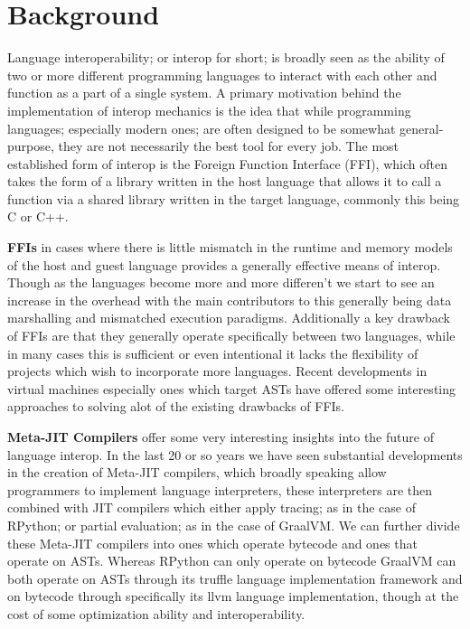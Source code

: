 \section{Background}\label{s:background}



Language interoperability; or interop for short; is broadly seen as the ability of two or more different programming languages to interact with each other and function as a part of a single system. A primary motivation behind the implementation of interop mechanics is the idea that while programming languages; especially modern ones; are often designed to be somewhat general-purpose, they are not necessarily the best tool for every job. The most established form of interop is the Foreign Function Interface (FFI), which often takes the form of a library written in the host language that allows it to call a function via a shared library written in the target language, commonly this being C or C++. 
\smallskip

\noindent \textbf{FFIs} in cases where there is little mismatch in the runtime and memory models of the host and guest language provides a generally effective means of interop. Though as the languages become more and more differen't we start to see an increase in the overhead with the main contributors to this generally being data marshalling and mismatched execution paradigms. Additionally a key drawback of FFIs are that they generally operate specifically between two languages, while in many cases this is sufficient or even intentional it lacks the flexibility of projects which wish to incorporate more languages. Recent developments in virtual machines especially ones which target ASTs have offered some interesting approaches to solving alot of the existing drawbacks of FFIs. 
\smallskip

\noindent \textbf{Meta-JIT Compilers} offer some very interesting insights into the future of language interop. In the last 20 or so years we have seen substantial developments in the creation of Meta-JIT compilers, which broadly speaking allow programmers to implement language interpreters, these interpreters are then combined with JIT compilers which either apply tracing; as in the case of RPython; or partial evaluation; as in the case of GraalVM. We can further divide these Meta-JIT compilers into ones which operate bytecode and ones that operate on ASTs. Whereas RPython can only operate on bytecode GraalVM can both operate on ASTs through its truffle language implementation framework and on bytecode through specifically its llvm language implementation, though at the cost of some optimization ability and interoperability. 

